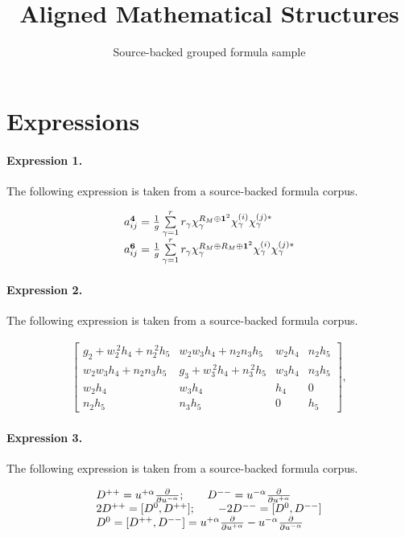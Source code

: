 \documentclass[11pt]{article}
\title{Aligned Mathematical Structures}
\author{Source-backed grouped formula sample}
\date{}
\begin{document}
\maketitle
\section{Expressions}
\paragraph{Expression 1.} The following expression is taken from a source-backed formula corpus.

\begin{align*}\begin{array}{l}a_{ij}^{{\bf 4}}= \frac{1}{g}\sum\limits_{\gamma=1}^{r}r_{\gamma }\chi_{\gamma }^{R_M \oplus {\bf 1}^2 }\chi_{\gamma }^{(i)}\chi_{\gamma }^{(j)*} \\a_{ij}^{{\bf 6}}=\frac{1}{g}\sum\limits_{\gamma=1}^{r}r_{\gamma }\chi_{\gamma }^{R_M \oplus R_M \oplus {\bf 1}^2 }\chi_{\gamma }^{(i)}\chi_{\gamma }^{(j)*} \\\end{array}\end{align*}

\paragraph{Expression 2.} The following expression is taken from a source-backed formula corpus.

\begin{align*}\left[\begin{array}{cccc}g_{2}+w_{2}^{\ 2}h_{4}+n_{2}^{\ 2}h_{5} & w_{2}w_{3}h_{4}+n_{2}n_{3}h_{5} &w_{2}h_{4} & n_{2}h_{5} \\w_{2}w_{3}h_{4}+n_{2}n_{3}h_{5} & g_{3}+w_{3}^{\ 2}h_{4}+n_{3}^{\ 2}h_{5} &w_{3}h_{4} & n_{3}h_{5} \\w_{2}h_{4} & w_{3}h_{4} & h_{4} & 0 \\n_{2}h_{5} & n_{3}h_{5} & 0 & h_{5}\end{array}\right] , \end{align*}

\paragraph{Expression 3.} The following expression is taken from a source-backed formula corpus.

\begin{align*}\begin{array}{lcr}D^{++}=u^{+ \alpha}{\partial\over{\partial u^{-\alpha}}};\qquad D^{--}=u^{- \alpha}{\partial\over{\partial u^{+\alpha}}}\\2D^{++}=[D^0,D^{++}];\qquad -2D^{--}=[D^0,D^{--}]\\D^0=[D^{++},D^{--}]=u^{+ \alpha}{\partial\over{\partial u^{+\alpha}}}-u^{- \alpha}{\partial\over{\partial u^{-\alpha}}}\end{array}\end{align*}
\end{document}
